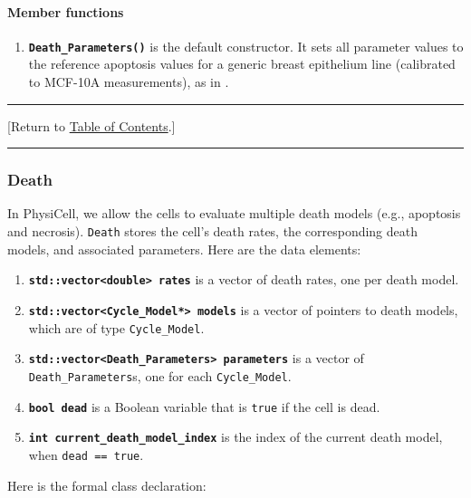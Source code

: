 \documentclass[12pt]{article}
\renewcommand{\v}{\verb}
\newcommand{\smallcode}[1]{\textbf{\texttt{#1}}}
\newcommand{\blue}[1]{\textcolor{blue}{#1}}
\newcommand{\DONE}{}%
\newcommand{\TOClink}{\begin{center}\hrule\vskip-5pt\phantom{.}\hfill[Return to \hyperlink{TOC}{Table of Contents}.]\hfill\phantom{.}\vskip3pt\hrule\end{center}}
\begin{document}
\paragraph{Member functions}
\begin{enumerate}
\item 
\smallcode{Death\_Parameters()} is the default constructor. It sets all 
parameter values to the reference apoptosis values for a 
generic breast epithelium line (calibrated to MCF-10A measurements), 
as in \cite{ref:PhysiCell}. 
\end{enumerate}

\TOClink 

\subsubsection{Death \DONE}
\label{sec:Death_Class}
In PhysiCell, we allow the cells to evaluate multiple death models (e.g., apoptosis and necrosis). 
\v|Death| stores the cell's death rates, the corresponding death models, and associated parameters. 
Here are the data elements: 
\begin{enumerate}
\item 
\smallcode{std::vector<double> rates} is a vector of death rates, one per death model. 

\item 
\smallcode{std::vector<Cycle\_Model*> models} is a vector of pointers to death models, 
which are of type \v|Cycle_Model|. 

\item 
\smallcode{std::vector<Death\_Parameters> parameters} is a vector of \v|Death_Parameters|s, 
one for each \v|Cycle_Model|.  

\item 
\smallcode{bool dead} is a Boolean variable that is \v|true| if the cell is dead. 

\item 
\smallcode{int current\_death\_model\_index} is the index of the current death model, 
when \v|dead == true|. 
\end{enumerate}

Here is the formal class declaration: 
\end{document}
